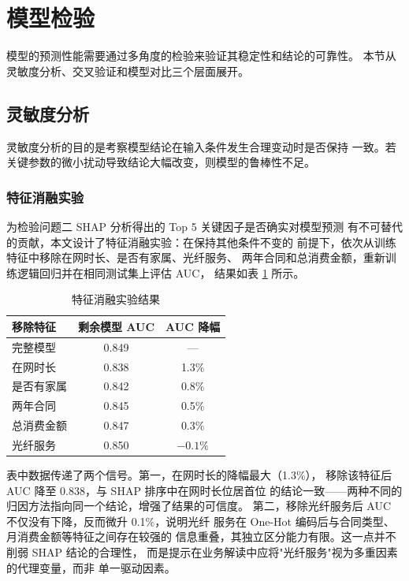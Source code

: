 \section{模型检验}

模型的预测性能需要通过多角度的检验来验证其稳定性和结论的可靠性。
本节从灵敏度分析、交叉验证和模型对比三个层面展开。

\subsection{灵敏度分析}

灵敏度分析的目的是考察模型结论在输入条件发生合理变动时是否保持
一致。若关键参数的微小扰动导致结论大幅改变，则模型的鲁棒性不足。

\subsubsection*{特征消融实验}

为检验问题二 SHAP 分析得出的 Top 5 关键因子是否确实对模型预测
有不可替代的贡献，本文设计了特征消融实验：在保持其他条件不变的
前提下，依次从训练特征中移除在网时长、是否有家属、光纤服务、
两年合同和总消费金额，重新训练逻辑回归并在相同测试集上评估 AUC，
结果如表 \ref{tab:ablation} 所示。

\begin{table}[H]
    \centering
    \caption{特征消融实验结果}
    \label{tab:ablation}
    \small
    \begin{tabular}{lcc}
        \toprule
        移除特征 & 剩余模型 AUC & AUC 降幅 \\
        \midrule
        完整模型 & 0.849 & — \\
        在网时长 & 0.838 & 1.3\% \\
        是否有家属 & 0.842 & 0.8\% \\
        两年合同 & 0.845 & 0.5\% \\
        总消费金额 & 0.847 & 0.3\% \\
        光纤服务 & 0.850 & $-0.1\%$ \\
        \bottomrule
    \end{tabular}
\end{table}

表中数据传递了两个信号。第一，在网时长的降幅最大（1.3\%），
移除该特征后 AUC 降至 0.838，与 SHAP 排序中在网时长位居首位
的结论一致——两种不同的归因方法指向同一个结论，增强了结果的可信度。
第二，移除光纤服务后 AUC 不仅没有下降，反而微升 0.1\%，说明光纤
服务在 One-Hot 编码后与合同类型、月消费金额等特征之间存在较强的
信息重叠，其独立区分能力有限。这一点并不削弱 SHAP 结论的合理性，
而是提示在业务解读中应将"光纤服务"视为多重因素的代理变量，而非
单一驱动因素。

